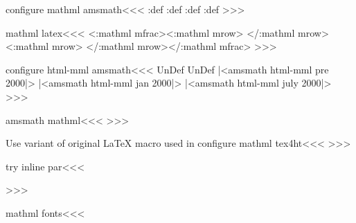 {{{{{{\<configure mathml amsmath\><<<
\pend:def
\pend:def
\pend:def
\pend:def
>>>

\<mathml latex\><<<
   {\Tg<\a:mathml mfrac>\Tg<\a:mathml mrow\Hnewline>}
   {\Tg</\a:mathml mrow>}
   {\Tg<\a:mathml mrow\Hnewline>}
   {\Tg</\a:mathml mrow>\Tg</\a:mathml mfrac>}
>>>



\<configure html-mml amsmath\><<<
\ifx \mathdisplay@@pop\:UnDef
   \ifx \emdf@La\:UnDef
      |<amsmath html-mml pre 2000|>
   \else
      |<amsmath html-mml jan 2000|>
   \fi
\else
   |<amsmath html-mml july 2000|>
\fi
>>>


%

\<amsmath mathml\><<<
   {\ifdim \textspace>0.2em
       \HCode{<\a:mathml mspace 
                         width="\textspace" \mml:class="tmspace"/>}%
    \else \HCode{<\a:mathml mspace 
                            width="0.3em" \mml:class="thinspace"/>}\fi
   }
>>>


Use variant of original LaTeX macro used in \textunderscore
\<configure mathml tex4ht\><<<
\def\mathunderscore{\nfss@text{\HChar{95}}}
>>>


\<try inline par\><<<
\ShowPar\par{\HCondtrue\noindent}%
>>>




\<mathml fonts\><<<

\def\providemtextclass#1{%
  \Configure{@mtext}{#1}%
}

}}}}}}
